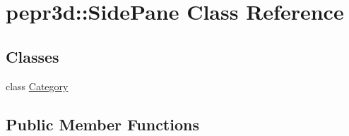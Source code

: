 \hypertarget{classpepr3d_1_1_side_pane}{}\section{pepr3d\+::Side\+Pane Class Reference}
\label{classpepr3d_1_1_side_pane}
\subsection*{Classes}
\begin{DoxyCompactItemize}
\item 
class \mbox{\hyperlink{classpepr3d_1_1_side_pane_1_1_category}{Category}}
\end{DoxyCompactItemize}
\subsection*{Public Member Functions}
